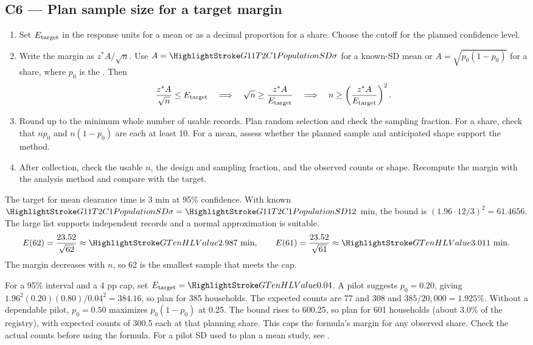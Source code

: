 \subsection{C6 --- Plan sample size for a target margin}\label{crit:c6}
\begin{enumerate}
  \item Set \(E_{\rm target}\) in the response units for a mean or as a decimal proportion for a share. Choose the cutoff for the planned confidence level.
  \item Write the margin as \(z^*A/\sqrt n\). Use \(A=\PopulationSD{\sigma}\) for a known-SD mean or \(A=\sqrt{p_0(1-p_0)}\) for a share, where \(p_0\) is the . Then
  \[
    \frac{z^*A}{\sqrt n}\le E_{\rm target}
    \quad\Longrightarrow\quad \sqrt n\ge\frac{z^*A}{E_{\rm target}}
    \quad\Longrightarrow\quad n\ge\left(\frac{z^*A}{E_{\rm target}}\right)^2.
  \]
  \item Round up to the minimum whole number of usable records. Plan random selection and check the sampling fraction. For a share, check that \(np_0\) and \(n(1-p_0)\) are each at least 10. For a mean, assess whether the planned sample and anticipated shape support the method.
  \item After collection, check the usable \(n\), the design and sampling fraction, and the observed counts or shape. Recompute the margin with the analysis method and compare with the target.
\end{enumerate}

 The target for mean clearance time is 3 min at 95\% confidence. With known \(\PopulationSD{\sigma}=\PopulationSD{12}\) min, the bound is \((1.96\cdot12/3)^2=61.4656\). The large list supports independent records and a normal approximation is suitable.
\[
  E(62)=\frac{23.52}{\sqrt{62}}\approx\Margin{2.987}\text{ min},\qquad
  E(61)=\frac{23.52}{\sqrt{61}}\approx\Margin{3.011}\text{ min}.
\]
The margin decreases with \(n\), so 62 is the smallest sample that meets the cap.

 For a 95\% interval and a 4 pp cap, set \(E_{\rm target}=\Margin{0.04}\). A pilot suggests \(p_0=0.20\), giving \(1.96^2(0.20)(0.80)/0.04^2=384.16\), so plan for 385 households. The expected counts are 77 and 308 and \(385/20{,}000=1.925\%\). Without a dependable pilot, \(p_0=0.50\) maximizes \(p_0(1-p_0)\) at 0.25. The bound rises to 600.25, so plan for 601 households (about 3.0\% of the registry), with expected counts of 300.5 each at that planning share. This caps the formula's margin for any observed share. Check the actual counts before using the formula. For a pilot SD used to plan a mean study, see .
\par\nobreak
{}

